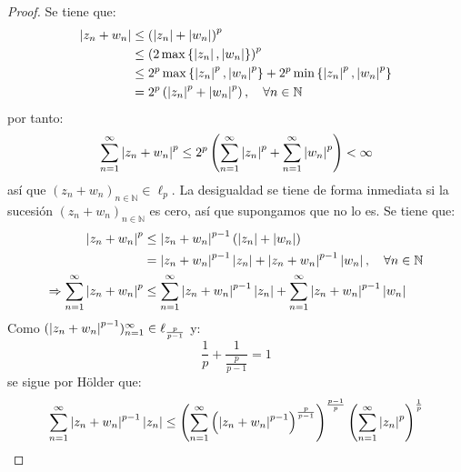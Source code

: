 \documentclass[twoside,12pt,a4 paper,openright]{book}
\begin{document}
\begin{enumerate}
    \begin{proof}
        Se tiene que:
        \begin{equation*}
            \begin{split}
                \left|z_n+w_n\right|&\leq\left(\left|z_n\right|+\left|w_n\right|\right)^p\\
                &\leq\left(2\max\left\{\left|z_n\right|,\left|w_n\right| \right\} \right)^p\\
                &\leq2^p\max\left\{\left|z_n\right|^p,\left|w_n\right|^p \right\}+2^p\min\left\{\left|z_n\right|^p,\left|w_n\right|^p \right\}\\
                &=2^p\left(\left|z_n\right|^p+\left|w_n\right|^p \right),\quad\forall n\in\mathbb{N} \\
            \end{split}
        \end{equation*}
        por tanto:
        \begin{equation*}
            \sum_{ n=1}^\infty\left|z_n+w_n\right|^p\leq 2^p\left(\sum_{ n=1}^\infty\left|z_n\right|^p+\sum_{ n=1}^\infty\left|w_n\right|^p \right)<\infty
        \end{equation*}
        as\'i que $(z_n+w_n)_{ n\in\mathbb{N}}\in\ell_p$. La desigualdad se tiene de forma inmediata si la sucesi\'on $(z_n+w_n)_{ n\in\mathbb{N}}$ es cero, así que supongamos que no lo es. Se tiene que:
        \begin{equation*}
            \begin{split}
                \left|z_n+w_n\right|^p&\leq\left|z_n+w_n\right|^{p-1}\left(\left|z_n\right|+\left|w_n\right|\right)\\
                &=\left|z_n+w_n\right|^{p-1}\left|z_n\right|+\left|z_n+w_n\right|^{p-1}\left|w_n\right|,\quad\forall n\in\mathbb{N}\\
                \Rightarrow\sum_{ n=1}^\infty\left|z_n+w_n\right|^p&\leq \sum_{ n=1}^\infty\left|z_n+w_n\right|^{p-1}\left|z_n\right|+\sum_{ n=1}^\infty\left|z_n+w_n\right|^{p-1}\left|w_n\right|
            \end{split}
        \end{equation*}
        Como $(\left|z_n+w_n\right|^{ p-1})_{ n=1}^\infty\in\ell_{\frac{p}{p-1}}$ y:
        \begin{equation*}
            \frac{1}{p}+\frac{1}{\frac{p}{p-1}}=1
        \end{equation*}
        se sigue por H\"older que:
        \begin{equation*}
            \begin{split}
                \sum_{ n=1}^\infty\abs{z_n+w_n}^{p-1}\abs{z_n}&\leq\left(\sum_{ n=1}^\infty\left(\abs{z_n+w_n}^{p-1}\right)^{\frac{p}{ p-1}} \right)^{\frac{p-1}{p}}\left(\sum_{ n=1}^\infty\abs{z_n}^p \right)^{\frac{1}{p}}\\

\end{split}
\end{equation*}
\end{proof}
\end{enumerate}
\end{document}
